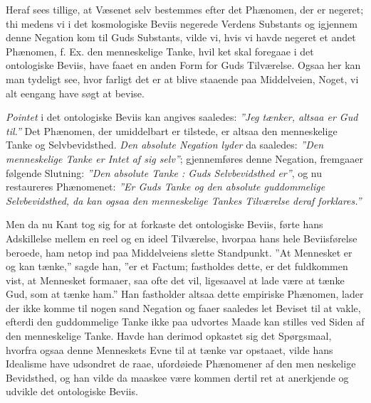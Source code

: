 \documentclass[12pt]{book}
\newcommand{\dsi}{\reflectbox{c}:}
\newcommand{\opage}[1]{\marginnote{\footnotesize\textit{[#1]}}}
\begin{document}
Heraf sees tillige, at Væsenet selv bestemmes efter det Phænomen, der er
negeret; thi medens vi i det kosmologiske Beviis negerede Verdens Substants og
igjennem denne Negation kom til Guds Substants, vilde vi, hvis vi havde negeret
et andet Phænomen, f. Ex. den menneskelige Tanke, hvil%
\opage{22}ket skal foregaae i det ontologiske Beviis, have faaet en anden Form for Guds
Tilværelse. Ogsaa her kan man tydeligt see, hvor farligt det er at blive
staaende paa Middelveien, Noget, vi alt eengang have søgt at bevise.

\emph{Pointet} i det ontologiske Beviis kan angives saaledes: \emph{”Jeg tænker,
altsaa er Gud til.”} Det Phænomen, der umiddelbart er tilstede, er altsaa den
menneskelige Tanke og Selvbevidsthed. \emph{Den absolute Negation lyder} da
saaledes: \emph{”Den menneskelige Tanke er Intet af sig selv”}; gjennemføres
denne Negation, fremgaaer følgende Slutning: \emph{”Den absolute Tanke \dsi{}
Guds Selvbevidsthed er”}, og nu restaureres Phænomenet: \emph{”Er Guds Tanke og
den absolute guddommelige Selvbevidsthed, da kan ogsaa den menneskelige Tankes
Tilværelse deraf forklares.”}

Men da nu Kant tog sig for at forkaste det ontologiske Beviis, førte hans
Adskillelse mellem en reel og en ideel Tilværelse, hvorpaa hans hele
Beviisførelse beroede, ham netop ind paa Middelveiens slette Standpunkt. ”At
Mennesket er og kan tænke,” sagde han, ”er et Factum; fastholdes dette, er det
fuldkommen vist, at Mennesket formaaer, saa ofte det vil, ligesaavel at lade
være at tænke Gud, som at tænke ham.” Han fastholder altsaa dette empiriske
Phænomen, lader der ikke komme til nogen sand Negation og faaer saaledes let
Beviset til at vakle, efterdi den guddommelige Tanke ikke paa udvortes Maade kan
stilles ved Siden af den menneskelige Tanke. Havde han derimod opkastet sig det
Spørgsmaal, hvorfra ogsaa denne Menneskets Evne til at tænke var opstaaet, vilde
hans Idealisme have udsondret de raae, ufordøiede Phænomener af den men%
\opage{23}neskelige Bevidsthed, og han vilde da maaskee være kommen dertil ret at
anerkjende og udvikle det ontologiske Beviis.
\end{document}
